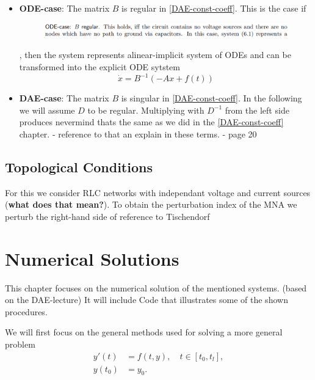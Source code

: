 \documentclass[11pt,titlepage]{article}
\begin{document}
			\begin{itemize}
				\item \textbf{ODE-case}: \newline
					The matrix $B$ is regular in \ref{DAE-const-coeff}. This is the case if
					\begin{figure}[H]
						\centering
						\includegraphics[width=0.7\linewidth]{screenshot006}
						\caption{}
						\label{fig:screenshot006}
					\end{figure}
					, then the system represents  alinear-implicit system of ODEs and can be transformed into the explicit ODE sytstem
					\begin{displaymath}
						\dot{x}=B^{-1}(-Ax+f(t))
					\end{displaymath}
					
				\item \textbf{DAE-case}:
					The matrix $B$ is singular in \ref{DAE-const-coeff}. In the following we will assume $D$ to be regular. Multiplying with $D^{-1}$ from the left side produces
					\newline
					nevermind thats the same as we did in the \ref{DAE-const-coeff} chapter. - reference to that an explain in these terms. - page 20
			\end{itemize}
		
		\subsection{Topological Conditions}
			For this we consider RLC networks with independant voltage and current sources (\textbf{what does that mean?}). To obtain the perturbation index of the MNA we perturb the right-hand side of  
			\newline reference to Tischendorf
		
		
	\newpage
	\section{Numerical Solutions}
		This chapter focuses on the numerical solution of the mentioned systems. (based on the DAE-lecture)
		It will include Code that illustrates some of the shown procedures.
		
		We will first focus on the general methods used for solving a more general problem
		\begin{equation}
			\label{general numerical problem}
			\begin{align}
				y'(t) &= f(t,y), \quad t \in [t_0, t_l], \\
				y(t_0) &= y_0.
			\end{align}
		\end{equation}
		
\end{document}
